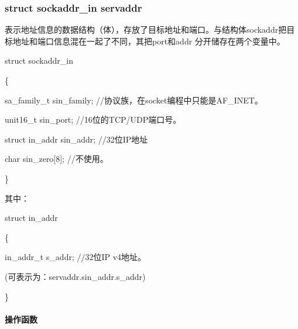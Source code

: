 \documentclass[UTF8]{article}%
\begin{document}
\subsubsection{struct sockaddr\_in servaddr}

表示地址信息的数据结构（体），存放了目标地址和端口。与结构体sockaddr把目标地址和端口信息混在一起了不同，其把port和addr 分开储存在两个变量中。

struct sockaddr\_in

\{

\qquad sa\_family\_t \quad sin\_family; //协议族，在socket编程中只能是AF\_INET。

\qquad unit16\_t \quad sin\_port; //16位的TCP/UDP端口号。

\qquad struct in\_addr \quad sin\_addr; //32位IP地址

\qquad char \quad sin\_zero[8]; //不使用。

\}

其中：

struct in\_addr 

\{

\qquad in\_addr\_t s\_addr; //32位IP v4地址。

\qquad (可表示为：servaddr.sin\_addr.s\_addr)

\}

\paragraph{操作函数}~{}
\end{document}
